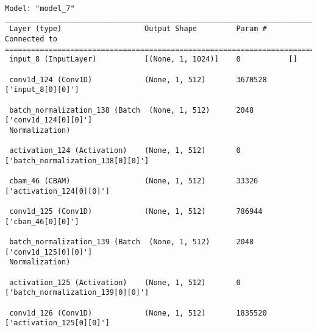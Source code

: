 \begin{lstlisting}
Model: "model_7"
__________________________________________________________________________________________________
 Layer (type)                   Output Shape         Param #     Connected to                     
==================================================================================================
 input_8 (InputLayer)           [(None, 1, 1024)]    0           []                               
                                                                                                  
 conv1d_124 (Conv1D)            (None, 1, 512)       3670528     ['input_8[0][0]']                
                                                                                                  
 batch_normalization_138 (Batch  (None, 1, 512)      2048        ['conv1d_124[0][0]']             
 Normalization)                                                                                   
                                                                                                  
 activation_124 (Activation)    (None, 1, 512)       0           ['batch_normalization_138[0][0]']
                                                                                                  
 cbam_46 (CBAM)                 (None, 1, 512)       33326       ['activation_124[0][0]']         
                                                                                                  
 conv1d_125 (Conv1D)            (None, 1, 512)       786944      ['cbam_46[0][0]']                
                                                                                                  
 batch_normalization_139 (Batch  (None, 1, 512)      2048        ['conv1d_125[0][0]']             
 Normalization)                                                                                   
                                                                                                  
 activation_125 (Activation)    (None, 1, 512)       0           ['batch_normalization_139[0][0]']
                                                                                                  
 conv1d_126 (Conv1D)            (None, 1, 512)       1835520     ['activation_125[0][0]']         
                                                                                                  

\end{lstlisting}
